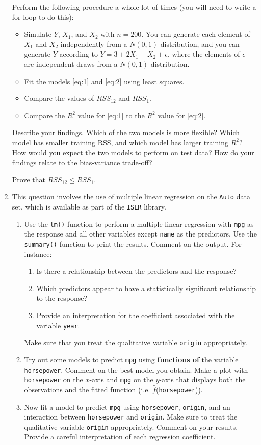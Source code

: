 \documentclass[12pt]{article}
\begin{document}
\begin{enumerate}
   
       Perform the following procedure a whole lot of times (you will need to write a for loop to do this):
   \begin{itemize}
   \item Simulate $Y$, $X_1$, and $X_2$ with $n=200$. You can generate each element of $X_1$ and $X_2$ independently from a $N(0,1)$ distribution, and you can generate $Y$ according to $Y = 3 + 2X_1 - X_2 + \epsilon$, where the elements of $\epsilon$ are independent draws from a $N(0,1)$ distribution. 
   \item Fit the models \eqref{eq:1} and \eqref{eq:2} using least squares.
   \item  Compare the values of $RSS_{12}$ and $RSS_1$. 
   \item Compare the $R^2$ value for \eqref{eq:1} to the $R^2$ value for \eqref{eq:2}. 
   \end{itemize}
  Describe your findings. Which of the two models is more flexible? Which model has smaller training RSS, and which model has larger training $R^2$? How would you expect the two models to perform on test data?  How do your findings relate to the bias-variance trade-off?
    
   Prove that $RSS_{12} \leq RSS_1$. 


\item This question involves the use of multiple linear regression on the
\verb=Auto= data set, which is available as part of the \verb=ISLR= library.
\begin{enumerate}

\item Use the \verb=lm()= function to perform a multiple linear regression
with \verb=mpg= as the response and all other variables except \verb=name= as
the predictors. Use the \verb=summary()= function to print the results.
Comment on the output. For instance:
\begin{enumerate}
\item Is there a relationship between the predictors and the response?
\item Which predictors appear to have a statistically significant
relationship to the response?
\item Provide an interpretation for the coefficient associated with the variable \verb=year=.
\end{enumerate}
Make sure that you treat the qualitative variable \verb=origin= appropriately.
\item Try out some models to predict \verb=mpg= using {\bf functions of} the variable \verb=horsepower=. Comment on the best model you obtain. Make a plot with \verb=horsepower= on the $x$-axis and \verb=mpg= on the $y$-axis that displays both the observations and the fitted function
 (i.e. $\hat{f}$(\verb=horsepower=)). 
\item Now fit a model to predict \verb=mpg= using \verb=horsepower=, \verb=origin=, and an interaction between \verb=horsepower= and \verb=origin=. Make sure to treat the qualitative variable \verb=origin= appropriately. Comment on your results. Provide a careful interpretation of each regression coefficient.
\end{enumerate}


\end{enumerate}
\end{document}
